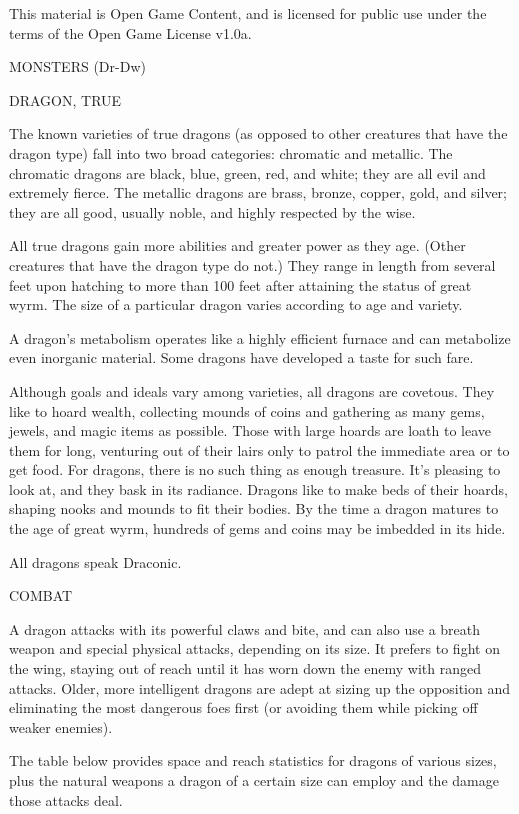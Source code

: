 \documentclass{article}
\begin{document}
This material is Open Game Content, and is licensed for public use under the terms 
of the Open Game License v1.0a.

{\LARGE{}MONSTERS (Dr-Dw)}

\vspace{12pt}
{\LARGE{}DRAGON, TRUE}

The known varieties of true dragons (as opposed to other creatures that have the 
dragon type) fall into two broad categories: chromatic and metallic. The chromatic 
dragons are black, blue, green, red, and white; they are all evil and extremely 
fierce. The metallic dragons are brass, bronze, copper, gold, and silver; they 
are all good, usually noble, and highly respected by the wise.

All true dragons gain more abilities and greater power as they age. (Other creatures 
that have the dragon type do not.) They range in length from several feet upon 
hatching to more than 100 feet after attaining the status of great wyrm. The size 
of a particular dragon varies according to age and variety.

A dragon's metabolism operates like a highly efficient furnace and can metabolize 
even inorganic material. Some dragons have developed a taste for such fare.

Although goals and ideals vary among varieties, all dragons are covetous. They 
like to hoard wealth, collecting mounds of coins and gathering as many gems, jewels, 
and magic items as possible. Those with large hoards are loath to leave them for 
long, venturing out of their lairs only to patrol the immediate area or to get 
food. For dragons, there is no such thing as enough treasure. It's pleasing to 
look at, and they bask in its radiance. Dragons like to make beds of their hoards, 
shaping nooks and mounds to fit their bodies. By the time a dragon matures to the 
age of great wyrm, hundreds of gems and coins may be imbedded in its hide.

All dragons speak Draconic.

COMBAT

A dragon attacks with its powerful claws and bite, and can also use a breath weapon 
and special physical attacks, depending on its size. It prefers to fight on the 
wing, staying out of reach until it has worn down the enemy with ranged attacks. 
Older, more intelligent dragons are adept at sizing up the opposition and eliminating 
the most dangerous foes first (or avoiding them while picking off weaker enemies).

The table below provides space and reach statistics for dragons of various sizes, 
plus the natural weapons a dragon of a certain size can employ and the damage those 
attacks deal.
\end{document}

